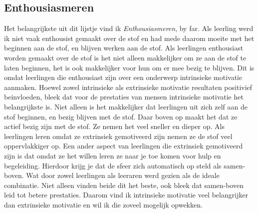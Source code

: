 \documentclass{article}
\begin{document}
        \subsection{Enthousiasmeren}
            Het belangrijkste uit dit lijstje vind ik \textit{Enthousiasmeren}, by far. Als leerling werd ik niet vaak enthousist gemaakt over de stof en had mede daarom moeite met het beginnen aan de stof, en blijven werken aan de stof. Als leerlingen enthousiast worden gemaakt over de stof is het niet alleen makkelijker om ze aan de stof te laten beginnen, het is ook makkelijker voor hun om er mee bezig te blijven. Dit is omdat leerlingen die enthousiast zijn over een onderwerp intrinsieke motivatie aanmaken.\cite{enthusiasm-creates-motivation}
            \bigskip
            \noindent Hoewel zowel intrinsieke als extrinsieke motivatie resultaten positivief beinvloeden, bleek dat voor de prestaties van mensen intrinsieke motivatie het belangrijkste is.\cite{intrinsic-motivation-is-more-important} Niet alleen is het makkelijker dat leerlingen uit zich zelf aan de stof beginnen, en bezig blijven met de stof. Daar boven op maakt het dat ze actief bezig zijn met de stof. Ze nemen het veel sneller en dieper op. Als leerlingen leren omdat ze extrinsiek gemotiveerd zijn nemen ze de stof veel oppervlakkiger op\cite{extrinsic-motivation-results-in-supperfical-learning}. Een ander aspect van leerlingen die extrinsiek gemotiveerd zijn is dat omdat ze het willen leren ze naar je toe komen voor hulp en begeleiding. Hierdoor krijg je dat de sfeer zich automatisch op steld als samen-boven. Wat door zowel leerlingen als leeraren werd gezien als de ideale combinatie. Niet alleen vinden beide dit het beste, ook bleek dat samen-boven leid tot betere prestaties.\cite{samen-boven-leads-to-better-results} Daarom vind ik intrinsieke motivatie veel belangrijker dan extrinsieke motivatie en wil ik die zoveel mogelijk opwekken. 
        
\end{document}
